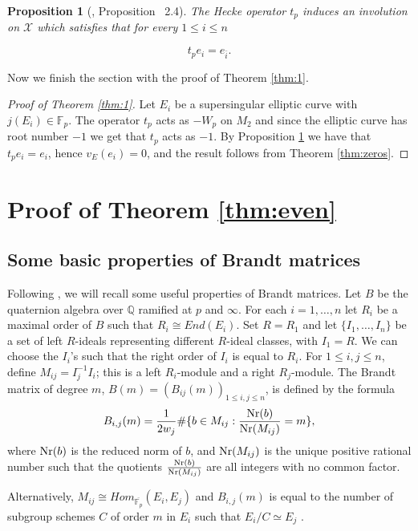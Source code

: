 \documentclass[13pt]{amsart}
\newtheorem{proposition}[theorem]{Proposition}
\theoremstyle{remark}
\numberwithin{theorem}{section} \numberwithin{equation}{section}
\begin{document}
\begin{proposition}[\cite{Gross}, Proposition ~2.4] \label{prop:tp}
The Hecke operator $t_{p}$ induces an involution on ${\mathcal{X}}$ which satisfies that for every $1 \le i \le n$

\[t_p e_{i}=e_{\bar{i}}  .\]

\end{proposition}

Now we finish the section with the proof of Theorem \ref{thm:1}.

\begin{proof}[Proof of Theorem \ref{thm:1}]
Let $E_{i}$ be a supersingular elliptic curve with $j(E_{i}) \in {\mathbb{F}_p}$. The 
operator $t_{p}$ acts as $-W_{p}$ on $M_2$ and since the elliptic curve has root 
number $-1$ we get that $t_{p}$ acts as $-1$. By Proposition \ref{prop:tp} we 
have that $t_{p}e_i=e_i$, hence ${v_{E}}( e_i)=0$, and the result follows from 
Theorem \ref{thm:zeros}.
\end{proof}

\section{Proof of Theorem \ref{thm:even}} \label{section:mod2}

\subsection{Some basic properties of Brandt matrices}
Following \cite{Gross}, we will recall some useful properties of Brandt matrices. 
Let $B$ be the quaternion algebra over ${\mathbb{Q}}$ ramified at $p$ and $\infty$. For 
each $i=1,\ldots,n$ let $R_i$ be a maximal order of $B$ such that $R_i \cong 
End(E_i)$. Set $R=R_1$ and  let $\{I_1, \ldots, I_n\}$ be a set of left 
$R$-ideals representing different $R$-ideal classes, with $I_1=R$. We can choose 
the
$I_i$'s such that the right order of $I_i$ is equal to $R_i$. For $1\le i,j \le 
n$, define $M_{ij}=I_j^{-1}I_i$; this is a left $R_i$-module and a right 
$R_j$-module. The Brandt matrix of degree $m$, $B(m)=(B_{ij}(m))_{1\le i,j \le 
n}$, is 
defined by the formula
\[
B_{i,j}(m)=\frac{1}{2 w_j}\# \{ b \in M_{ij}: \frac{{\rm Nr}(b)}{{\rm Nr}(M_{ij})} = m\},
\]
where ${\rm Nr}(b)$ is the reduced norm of $b$, and ${\rm Nr}(M_{ij})$ is the unique positive rational number such that the quotients $\frac{{\rm Nr}(b)}{{\rm Nr}(M_{ij})}$ are all integers with no common factor. 

Alternatively, $M_{ij} \cong Hom_{\overline{\mathbb{F}_p}}{(E_i, E_j)}$ and $B_{i,j}(m)$ is equal to the number of subgroup schemes $C$ of order $m$ in $E_i$ such that $E_i/C \simeq E_j$ \cite[Proposition ~2.3]{Gross}. 
\end{document}
